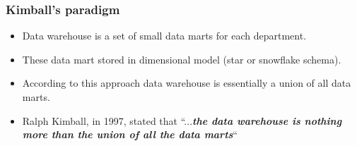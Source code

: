 \begin{frame}
	\frametitle{Kimball's paradigm}
	\begin{itemize}[<+->]
		\item  Data warehouse is a set of small data marts for each department. 
		\item These data mart stored in dimensional model (star or snowflake schema).
		\item According to this approach data warehouse is essentially a union of all data marts.
		\item Ralph Kimball, in 1997, stated that “...\textbf{\textit{the data warehouse is nothing more than the union of all the data marts}}“
	\end{itemize}
	
\end{frame}

